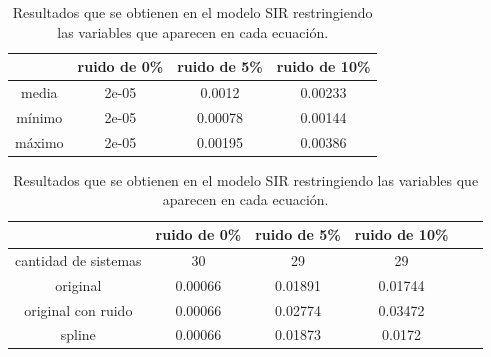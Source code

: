 \begin{table}[!h]
    \centering
    \caption{Resultados que se obtienen en el modelo SIR restringiendo las variables que aparecen en cada ecuación.}
    \begin{tabular}{|c|c|c|c|}
        \hline
               & \textbf{ruido de 0\%} & \textbf{ruido de 5\%} & \textbf{ruido de 10\%} \\
        \hline
        media  & 2e-05                 & 0.0012                & 0.00233                \\
        \hline
        mínimo & 2e-05                 & 0.00078               & 0.00144                \\
        \hline
        máximo & 2e-05                 & 0.00195               & 0.00386                \\
        \hline
    \end{tabular}

    \begin{tabular}{|c|c|c|c|c|c|}
        \hline
                             & \textbf{ruido de 0\%} & \textbf{ruido de 5\%} & \textbf{ruido de 10\%} \\
        \hline
        cantidad de sistemas & 30                    & 29                    & 29                     \\
        \hline
        original             & 0.00066               & 0.01891               & 0.01744                \\
        \hline
        original con ruido   & 0.00066               & 0.02774               & 0.03472                \\
        \hline
        spline               & 0.00066               & 0.01873               & 0.0172                 \\
        \hline
    \end{tabular}
    \label{table:experiment_SIR}
\end{table}

